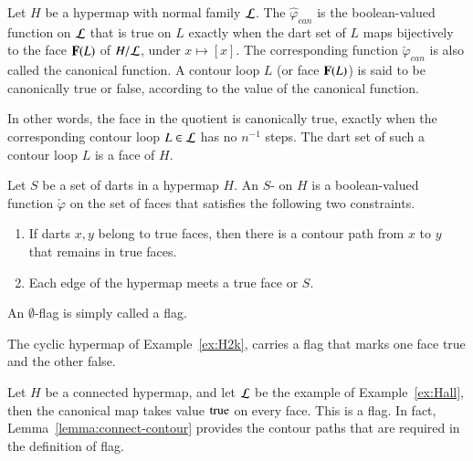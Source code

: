 \begin{definition} Let $H$ be a hypermap with
  normal family $\cal L$.  The 
  $\hat\varphi_{can}$ is the boolean-valued function on ${\cal L}$
  that is true on $L$ exactly when the dart set of $L$ maps
  bijectively to the face ${\mathbf F}(L)$ of $H/{\cal L}$, under $x\mapsto [x]$.  The
  corresponding function $\check\varphi_{can}$ is also called the
  canonical function.  A contour loop $L$ (or face ${\mathbf F}(L)$)
  is said to be canonically true or false, according to the value of the canonical
  function.  
%
\end{definition}

In other words, the face in the quotient is canonically true, exactly
when the corresponding contour loop $L\in {\cal L}$ has no $n^{-1}$
steps.  The dart set of such a contour loop $L$ is a face of $H$.  


\begin{definition}[flag]\label{def:flag} 
  Let $S$ be a set of darts in a hypermap $H$.  An $S$-
  on $H$ is a boolean-valued function $\check\varphi$ on the set of faces that
  satisfies the following two constraints.
\begin{enumerate}
\item If darts $x,y$ belong to true faces,
then there is a contour path from $x$ to $y$ that remains
in true faces.
\item Each edge of the hypermap meets a true face or $S$.
\end{enumerate}
An $\emptyset$-flag is simply called a flag.
%
%
\end{definition}



\begin{example} 
The cyclic hypermap of Example~\ref{ex:H2k}, carries a
flag that marks one face true and the other false.
\end{example}

\begin{example}\label{ex:Hall-flag} 
Let $H$ be a connected hypermap, and let $\cal L$ be the example of
Example~\ref{ex:Hall}, then the canonical map takes value
${\operatorname{true}}$ on every face.  This is a flag. In fact,
Lemma~\ref{lemma:connect-contour} provides the contour paths that
are required in the definition of flag.
\end{example}


